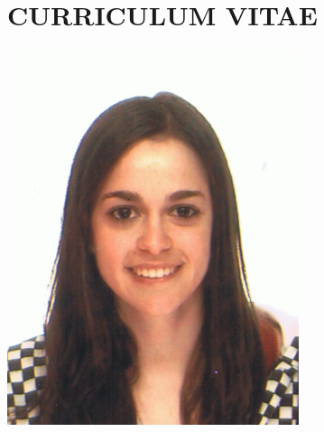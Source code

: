 \documentclass[10pt,a4paper,notitlepage]{article}
\author{Nerea Gonzalez Cordero}
\begin{document}

\noindent
\begin{minipage}[t]{0.75\textwidth}
	\vspace{0pt}
	\section*{CURRICULUM VITAE}
\end{minipage}
\begin{minipage}[t]{0.25\textwidth}
	\vspace{-20pt}
	\includegraphics[width=0.64\textwidth]{fotocarnet.jpg}
\end{minipage}
\end{document}
